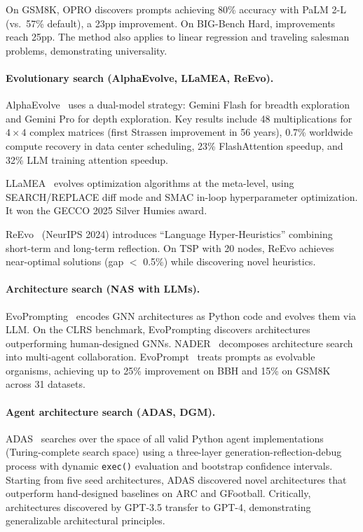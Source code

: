 On GSM8K, OPRO discovers prompts achieving 80\% accuracy with PaLM 2-L (vs.\ 57\% default), a 23pp improvement. On BIG-Bench Hard, improvements reach 25pp. The method also applies to linear regression and traveling salesman problems, demonstrating universality.

\paragraph{Evolutionary search (AlphaEvolve, LLaMEA, ReEvo).}
AlphaEvolve~\citep{novikov2025alphaevolve} uses a dual-model strategy: Gemini Flash for breadth exploration and Gemini Pro for depth exploration. Key results include 48 multiplications for $4\times4$ complex matrices (first Strassen improvement in 56 years), 0.7\% worldwide compute recovery in data center scheduling, 23\% FlashAttention speedup, and 32\% LLM training attention speedup.

LLaMEA~\citep{van2024llaMEA} evolves optimization algorithms at the meta-level, using SEARCH/REPLACE diff mode and SMAC in-loop hyperparameter optimization. It won the GECCO 2025 Silver Humies award.

ReEvo~\citep{ye2024reevo} (NeurIPS 2024) introduces ``Language Hyper-Heuristics'' combining short-term and long-term reflection. On TSP with 20 nodes, ReEvo achieves near-optimal solutions (gap $<$ 0.5\%) while discovering novel heuristics.

\paragraph{Architecture search (NAS with LLMs).}
EvoPrompting~\citep{chen2024evoprompting} encodes GNN architectures as Python code and evolves them via LLM. On the CLRS benchmark, EvoPrompting discovers architectures outperforming human-designed GNNs. NADER~\citep{nasr2024nader} decomposes architecture search into multi-agent collaboration. EvoPrompt~\citep{guo2023evoprompt} treats prompts as evolvable organisms, achieving up to 25\% improvement on BBH and 15\% on GSM8K across 31 datasets.

\paragraph{Agent architecture search (ADAS, DGM).}
ADAS~\citep{hu2024adas} searches over the space of all valid Python agent implementations (Turing-complete search space) using a three-layer generation-reflection-debug process with dynamic \texttt{exec()} evaluation and bootstrap confidence intervals. Starting from five seed architectures, ADAS discovered novel architectures that outperform hand-designed baselines on ARC and GFootball. Critically, architectures discovered by GPT-3.5 transfer to GPT-4, demonstrating generalizable architectural principles.

